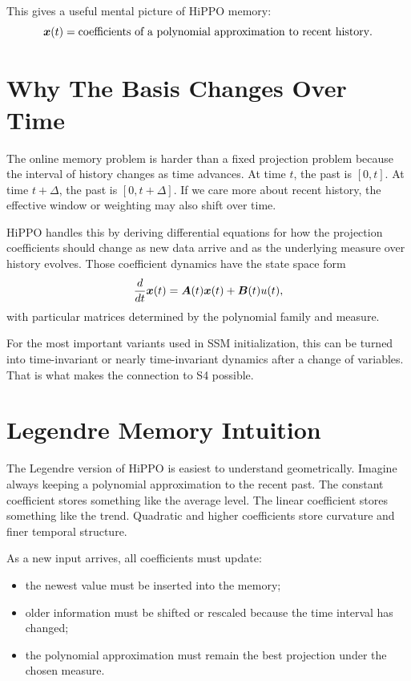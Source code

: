 This gives a useful mental picture of HiPPO memory:
\[
  \bm{x}(t)
  =
  \text{coefficients of a polynomial approximation to recent history}.
\]

\section{Why The Basis Changes Over Time}

The online memory problem is harder than a fixed projection problem because the interval
of history changes as time advances. At time $t$, the past is $[0,t]$. At time $t+\Delta$,
the past is $[0,t+\Delta]$. If we care more about recent history, the effective window or
weighting may also shift over time.

HiPPO handles this by deriving differential equations for how the projection coefficients
should change as new data arrive and as the underlying measure over history evolves.
Those coefficient dynamics have the state space form
\[
  \frac{d}{dt}\bm{x}(t) = \bm{A}(t)\bm{x}(t)+\bm{B}(t)u(t),
\]
with particular matrices determined by the polynomial family and measure.

For the most important variants used in SSM initialization, this can be turned into
time-invariant or nearly time-invariant dynamics after a change of variables. That is
what makes the connection to S4 possible.

\section{Legendre Memory Intuition}

The Legendre version of HiPPO is easiest to understand geometrically. Imagine always
keeping a polynomial approximation to the recent past. The constant coefficient stores
something like the average level. The linear coefficient stores something like the trend.
Quadratic and higher coefficients store curvature and finer temporal structure.

As a new input arrives, all coefficients must update:

\begin{itemize}
  \item the newest value must be inserted into the memory;
  \item older information must be shifted or rescaled because the time interval has
  changed;
  \item the polynomial approximation must remain the best projection under the chosen
  measure.
\end{itemize}

